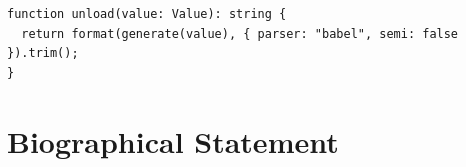 \documentclass[12pt, oneside]{book}
\begin{document}

\begin{verbatim}
function unload(value: Value): string {
  return format(generate(value), { parser: "babel", semi: false }).trim();
}
\end{verbatim}

\appendix

\backmatter




\chapter{Biographical Statement}

\end{document}
